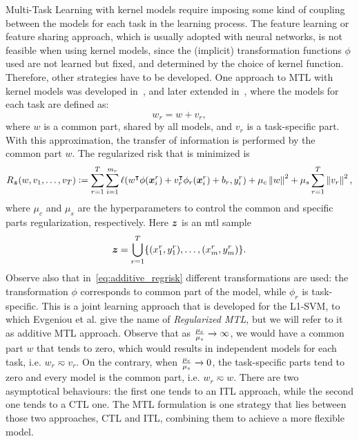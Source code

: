 Multi-Task Learning with kernel models require imposing some kind of coupling between the models for each task in the learning process. The feature learning or feature sharing approach, which is usually adopted with neural networks, is not feasible when using kernel models, since the (implicit) transformation functions $\phi$ used are not learned but fixed, and determined by the choice of kernel function. Therefore, other strategies have to be developed. 
One approach to MTL with kernel models was developed in~\cite{EvgeniouP04}, and later extended in~\citet{CaiC09, CaiC12}, where the models for each task are defined as:
\begin{equation}
    \nonumber
    {w}_r = {w} + {v}_r,
\end{equation} 
where $w$ is a common part, shared by all models, and $v_r$ is a task-specific part. With this approximation, the transfer of information is performed by the common part ${w}$.
The regularized risk that is minimized is 
\begin{equation}
    \label{eq:additive_regrisk}
    \risk_{\bsample} ({w, v_1, \ldots, v_\ntasks}) \defeq \sum_{r=1}^{\ntasks} \sum_{i=1}^{\npertask_r} \lossf({w}^\intercal {\phi(\fv{x}_i^r)} + {v}_r^\intercal {\phi_r(\fv{x}_i^r)} + b_r, y_i^r) + \mu_c \norm{{w}}^2 + \mu_s \sum_{r=1}^\ntasks \norm{{v}_r}^2,
\end{equation}
where $\mu_c$ and $\mu_s$ are the hyperparameters to control the common and specific parts regularization, respectively. Here $\bm{z}$ is an \acrshort{mtl} sample $$\bm{z} = \bigcup_{r=1}^T \{(x_1^r, y_1^r), \ldots, (x_{m}^r, y_{m}^r)\}.$$
Observe also that in~\eqref{eq:additive_regrisk} different transformations are used: the transformation $\phi$ corresponds to common part of the model, while $\phi_r$ is task-specific.
%
This is a joint learning approach that is developed for the L1-SVM, to which Evgeniou et al. give the name of \emph{Regularized MTL}, but we will refer to it as {additive} MTL approach.
%
Observe that as $\frac{\mu_c}{\mu_s} \xrightarrow[]{} \infty $, we would have a common part ${w}$ that tends to zero, which would results in independent models for each task, i.e. ${w}_r \eqsim {v}_r$. On the contrary, when $\frac{\mu_c}{\mu_s} \xrightarrow[]{} 0 $, the task-specific parts tend to zero and every model is the common part, i.e. ${w}_r \eqsim {w}$.
There are two asymptotical behaviours: the first one tends to an ITL approach, while the second one tends to a CTL one. The MTL formulation is one strategy that lies between those two approaches, CTL and ITL, combining them to achieve a more flexible model.

